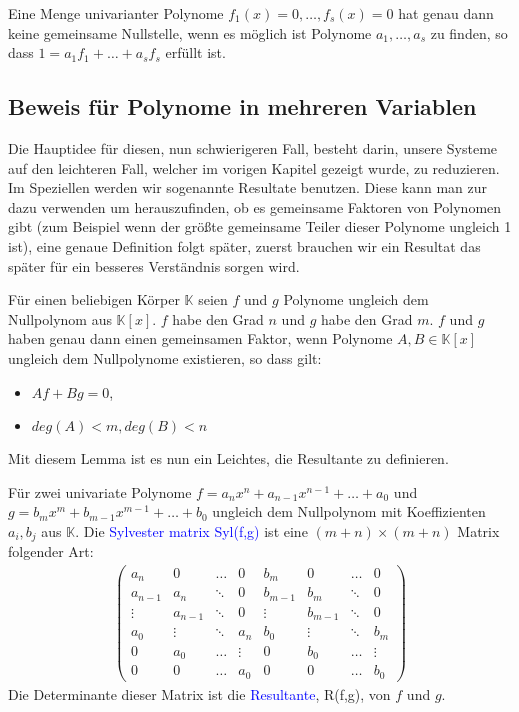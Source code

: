 \begin{corollary}
Eine Menge univarianter Polynome $f_1(x)=0,\ldots,f_s(x)=0$ hat genau dann keine gemeinsame Nullstelle, wenn es möglich ist Polynome $a_1,\ldots, a_s$ zu finden, so dass $1 = a_1f_1+ \ldots + a_sf_s$ erfüllt ist.
\end{corollary}

\subsection{Beweis für Polynome in mehreren Variablen}

Die Hauptidee für diesen, nun schwierigeren Fall, besteht darin, unsere Systeme auf den leichteren Fall, welcher im vorigen Kapitel gezeigt wurde, zu reduzieren. Im Speziellen werden wir sogenannte Resultate benutzen. Diese kann man zur dazu verwenden um herauszufinden, ob es gemeinsame Faktoren von Polynomen gibt (zum Beispiel wenn der größte gemeinsame Teiler dieser Polynome ungleich 1 ist), eine genaue Definition folgt später, zuerst brauchen wir ein Resultat das später für ein besseres Verständnis sorgen wird.

\begin{lemma}
Für einen beliebigen Körper $\mathbb{K}$ seien $f$ und $g$ Polynome ungleich dem Nullpolynom aus $\mathbb{K}[x]$. $f$ habe den Grad $n$ und $g$ habe den Grad $m$. $f$ und $g$ haben genau dann einen gemeinsamen Faktor, wenn Polynome $A,B \in \mathbb{K}[x]$ ungleich dem Nullpolynome existieren, so dass gilt:
\begin{itemize}
\item $Af + Bg = 0$,
\item $deg(A) < m, deg(B) < n$
\end{itemize}
\end{lemma}

\noindent Mit diesem Lemma ist es nun ein Leichtes, die Resultante zu definieren.

\begin{definition}
Für zwei univariate Polynome $f = a_nx^n+a_{n-1}x^{n-1}+\ldots + a_0$ und $g = b_mx^m+b_{m-1}x^{m-1}+\ldots+b_0$ ungleich dem Nullpolynom mit Koeffizienten $a_i, b_j$ aus $\mathbb{K}$. Die \textcolor{blue}{Sylvester matrix Syl(f,g)} ist eine $(m+n) \times (m+n)$ Matrix folgender Art:
\begin{align*}
\begin{pmatrix}
a_n & 0 &\dots & 0 & b_m & 0 & \ldots & 0 \\
a_{n-1} & a_n & \ddots & 0 & b_{m-1} & b_m & \ddots & 0 \\
\vdots & a_{n-1} & \ddots & 0 & \vdots & b_{m-1} & \ddots & 0 \\
a_0 & \vdots & \ddots & a_n & b_0 & \vdots & \ddots & b_m\\
0 & a_0 & \dots & \vdots & 0 & b_0 & \dots & \vdots \\
0 & 0 & \dots & a_0 & 0 & 0 & \dots & b_0
\end{pmatrix}
\end{align*}
Die Determinante dieser Matrix ist die \textcolor{blue}{Resultante}, R(f,g), von $f$ und $g$. 
\end{definition}

